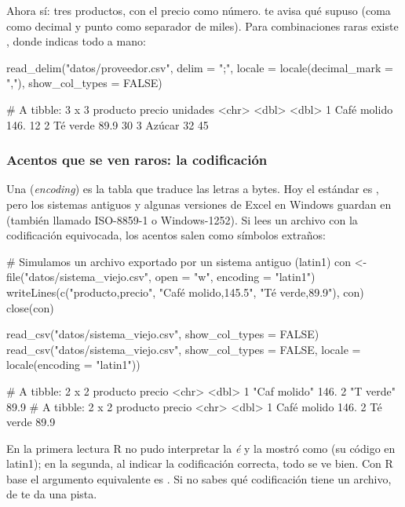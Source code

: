 Ahora sí: tres productos, con el precio como número. 
te avisa qué supuso (coma como decimal y punto como separador de miles).
Para combinaciones raras existe , donde indicas todo
a mano:

\begin{rcode}
read_delim("datos/proveedor.csv", delim = ";",
           locale = locale(decimal_mark = ","), show_col_types = FALSE)
\end{rcode}
\begin{rsalida}
# A tibble: 3 x 3
  producto    precio unidades
  <chr>        <dbl>    <dbl>
1 Café molido  146.        12
2 Té verde      89.9       30
3 Azúcar        32         45
\end{rsalida}

\subsubsection{Acentos que se ven raros: la codificación}

Una  (\emph{encoding}) es la tabla que traduce las
letras a bytes. Hoy el estándar es , pero los sistemas
antiguos y algunas versiones de Excel en Windows guardan en
 (también llamado ISO-8859-1 o Windows-1252). Si lees un
archivo con la codificación equivocada, los acentos salen como símbolos
extraños:

\begin{rcode}
# Simulamos un archivo exportado por un sistema antiguo (latin1)
con <- file("datos/sistema_viejo.csv", open = "w", encoding = "latin1")
writeLines(c("producto,precio", "Café molido,145.5", "Té verde,89.9"), con)
close(con)

read_csv("datos/sistema_viejo.csv", show_col_types = FALSE)
read_csv("datos/sistema_viejo.csv", show_col_types = FALSE,
         locale = locale(encoding = "latin1"))
\end{rcode}
\begin{rsalida}
# A tibble: 2 x 2
  producto         precio
  <chr>             <dbl>
1 "Caf molido"  146. 
2 "T verde"      89.9
# A tibble: 2 x 2
  producto    precio
  <chr>        <dbl>
1 Café molido  146. 
2 Té verde      89.9
\end{rsalida}

En la primera lectura R no pudo interpretar la \emph{é} y la mostró como
 (su código en latin1); en la segunda, al
indicar la codificación correcta, todo se ve bien. Con R base el argumento
equivalente es . Si no
sabes qué codificación tiene un archivo, 
de  te da una pista.


